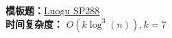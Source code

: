\textbf{模板题：}\href{https://www.luogu.com.cn/problem/SP288}{Luogu SP288}\\
\textbf{时间复杂度：} $O(k \log^3(n)), k = 7$